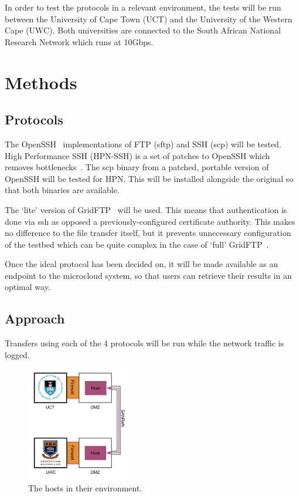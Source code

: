 \documentclass{sig-alternate-05-2015}
\begin{document}
In order to test the protocols in a relevant environment, the tests will be run between the University of Cape Town (UCT) and the University of the Western Cape (UWC). Both universities are connected to the South African National Research Network \cite{sanren} which runs at 10Gbps.

\section{Methods}
\subsection{Protocols}
The OpenSSH~\cite{openssh} implementations of FTP (sftp) and SSH (scp) will be tested. High Performance SSH (HPN-SSH) is a set of patches to OpenSSH which removes bottlenecks~\cite{rapier2008high}. The scp binary from a patched, portable version of OpenSSH will be tested for HPN. This will be installed alongside the original so that both binaries are available.

The `lite' version of GridFTP~\cite{allcock2005globus} will be used. This means that authentication is done via ssh as opposed a previously-configured certificate authority. This makes no difference to the file transfer itself, but it prevents unnecessary configuration of the testbed which can be quite complex in the case of `full' GridFTP~\cite{gridftplite}.

Once the ideal protocol has been decided on, it will be made available as an endpoint to the microcloud system, so that users can retrieve their results in an optimal way.

\subsection{Approach}
Transfers using each of the 4 protocols will be run while the network traffic is logged.

\begin{figure}[H]
	\centering
	\includegraphics[width=0.4\textwidth]{img/route.png}
	\caption{The hosts in their environment.
	         \label{fig:route}}
\end{figure}
\end{document}
